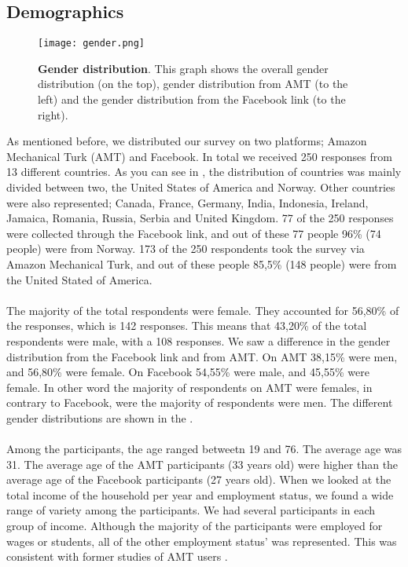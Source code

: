 \subsection{Demographics}

\begin{figure}[h!]
\centering
\texttt{[image: gender.png]}
\caption[Gender distribution]{\textbf{Gender distribution}. This graph shows the overall gender distribution (on the top), gender distribution from AMT (to the left) and the gender distribution from the Facebook link (to the right).} 
\label{fig:gender}
\end{figure}

As mentioned before, we distributed our survey on two platforms; Amazon Mechanical Turk (AMT) and Facebook. In total we received 250 responses from 13 different countries. As you can see in , the distribution of countries was mainly divided between two, the United States of America and Norway. Other countries were also represented; Canada, France, Germany, India, Indonesia, Ireland, Jamaica, Romania, Russia, Serbia and United Kingdom. 77 of the 250 responses were collected through the Facebook link, and out of these 77 people 96\% (74 people) were from Norway. 173 of the 250 respondents took the survey via Amazon Mechanical Turk, and out of these people 85,5\% (148 people) were from the United Stated of America. 

\paragraph{}
The majority of the total respondents were female. They accounted for 56,80\% of the responses, which is 142 responses. This means that 43,20\% of the total respondents were male, with a 108 responses. We saw a difference in the gender distribution from the Facebook link and from AMT. On AMT 38,15\% were men, and 56,80\% were female. On Facebook 54,55\% were male, and 45,55\% were female. In other word the majority of respondents on AMT were females, in contrary to Facebook, were the majority of respondents were men. The different gender distributions are shown in the .
 
\paragraph{}
Among the participants, the age ranged betweetn 19 and 76. The average age was 31. The average age of the AMT participants (33 years old) were higher than the average age of the Facebook participants (27 years old). When we looked at the total income of the household per year and employment status, we found a wide range of variety among the participants. We had several participants in each group of income. Although the majority of the participants were employed for wages or students, all of the other employment status' was represented. This was consistent with former studies of AMT users \cite{incentivesAmt}. 


